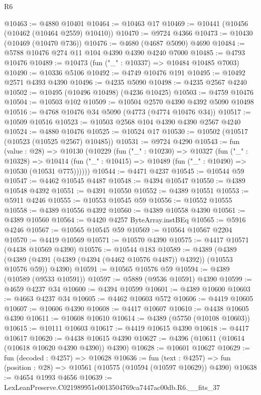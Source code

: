 \begin{lexlean}{R6}
\begin{coremodule}
@10463 := @4880 @10401
@10464 := @10463 @17
@10469 := @10441 (@10456 (@10462 (@10464 @2559) @10410))
@10470 := @9724 @4366
@10473 := @10430 (@10469 (@10470 @736))
@10476 := @4680 (@4687 @5090) @4690
@10484 := @5788 @10476 @274 @11 @104 @4390 @4390 @4240 @7000
@10485 := @4793 @10476
@10489 := @10473 (fun ("_" : @10337) => @10484 @10485 @7003)
@10490 := @10336 @5106
@10492 := @4749 @10476 @191
@10495 := @10492 @2571 @4393 @4390
@10496 := @4235 @5090
@10498 := @4235 @2567 @4240
@10502 := @10495 (@10496 @10498) (@4236 @10425)
@10503 := @4759 @10476
@10504 := @10503 @102
@10509 := @10504 @2570 @4390 @4392 @5090 @10498
@10516 := @4768 @10476 @34 @5090 (@4773 (@4774 @10476 @34))
@10517 := @10509 @10516
@10523 := @10503 @2568 @104 @4390 @4390 @2567 @4240
@10524 := @4880 @10476
@10525 := @10524 @17
@10530 := @10502 (@10517 (@10523 (@10525 @2567) @10485))
@10531 := @9724 @4290
@10543 := fun (value : @28) =>
  @10130
    (@10229
      (fun ("_" : @10230) =>
      @10327
        (fun ("_" : @10328) =>
        @10414 (fun ("_" : @10415) => @10489 (fun ("_" : @10490) => @10530 (@10531 @775))))))
@10544 := @4471 @4237
@10545 := @10544 @59
@10547 := @4462 @10545 @4487
@10548 := @4394 @10547
@10550 := @4389 @10548 @4392
@10551 := @4391 @10550
@10552 := @4389 @10551
@10553 := @5911 @4246
@10555 := @10553 @10545 @59
@10556 := @10552 @10555
@10558 := @4389 @10556 @4392
@10560 := @4389 @10558 @4390
@10561 := @4389 @10560
@10564 := @4420 @4257 ByteArray.instBEq
@10565 := @5916 @4246
@10567 := @10565 @10545 @59
@10569 := @10564 @10567 @2204
@10570 := @4419 @10569
@10571 := @10570 @4390
@10575 := @4417 @10571 (@4438 @10569 @4390)
@10576 := @10544 @183
@10589 := @4389
    (@4389 (@4389 (@4391 (@4389 (@4394 (@4462 @10576 @4487)) @4392)) (@10553 @10576 @59)) @4390)
@10591 := @10565 @10576 @59
@10594 := @4389 (@10589 (@9533 @10591))
@10597 := @5889 (@9536 @10591) @4390
@10599 := @4659 @4237 @34
@10600 := @4394 @10599
@10601 := @4389 @10600
@10603 := @4663 @4237 @34
@10605 := @4462 @10603 @572
@10606 := @4419 @10605
@10607 := @10606 @4390
@10608 := @4417 @10607
@10610 := @4438 @10605 @4390
@10611 := @10608 @10610
@10614 := @4389 (@5750 (@10108 @10603))
@10615 := @10111 @10603
@10617 := @4419 @10615 @4390
@10618 := @4417 @10617
@10620 := @4438 @10615 @4390
@10627 := @4396 (@10611 (@10614 (@10618 @10620 @4390 @4390)) @4390)
@10628 := @10601 @10627
@10629 := fun (decoded : @4257) => @10628
@10636 := fun (text : @4257) =>
  fun (position : @28) => @10561 (@10575 (@10594 (@10597 @10629)) @4390)
@10638 := @4654 @1993 @4656
@10639 := LexLeanPreserve.C021989951e0013504769ca7447ac00db.R6.__fits_37

\end{coremodule}
\end{lexlean}
